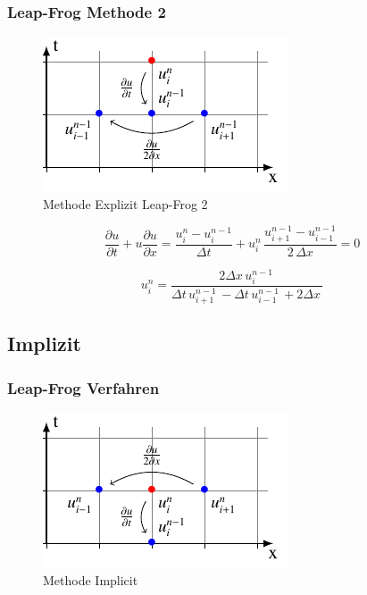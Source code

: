 \subsubsection{Leap-Frog Methode 2}
     \begin{figure}[!ht]
	\centering
	\includegraphics[height=.4\textwidth]{papers/burgers/BurgersEquation/tikz/Linear4/Linear4.pdf}
	\caption{Methode Explizit  Leap-Frog 2}
	\label{burgers:fig:Linear4}
	\end{figure}

\begin{equation}
\frac {\partial u}{\partial t}+u{\frac {\partial u}{\partial x}} = \frac{u_{i}^{n}-u_{i}^{n-1}}{\Delta t}+ u_{i}^{n}\, \frac{u_{i+1}^{n-1}-u_{i-1}^{n-1}}{2\,\Delta x}=0
\end{equation}

\begin{equation}
u_{i}^{n} = \frac{2 \Delta{x}\, u^{n-1}_{i}\,}{\Delta{t}\, u^{n-1}_{i+1}\, - \Delta{t}\, u^{n-1}_{i-1}\, + 2 \Delta{x}\,}
\end{equation}

\subsection{Implizit}
\subsubsection{Leap-Frog Verfahren}

     \begin{figure}[!ht]
	\centering
	\includegraphics[height=.4\textwidth]{papers/burgers/BurgersEquation/tikz/implicit/implicit.pdf}
	\caption{Methode Implicit}
	\label{burgers:fig:Implicit}
\end{figure}

